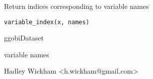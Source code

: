 \documentclass{article}
\begin{document}
\begin{Description}\relax
Return indices corresponding to variable names
\end{Description}
\begin{Usage}
\begin{verbatim}variable_index(x, names)\end{verbatim}
\end{Usage}
\begin{Arguments}
\begin{ldescription}
\item[\code{x}] ggobiDataset
\item[\code{names}] variable names
\end{ldescription}
\end{Arguments}
\begin{Details}\relax
\end{Details}
\begin{Author}\relax
Hadley Wickham <h.wickham@gmail.com>
\end{Author}
\begin{Examples}
\begin{ExampleCode}\end{ExampleCode}
\end{Examples}
\end{document}
